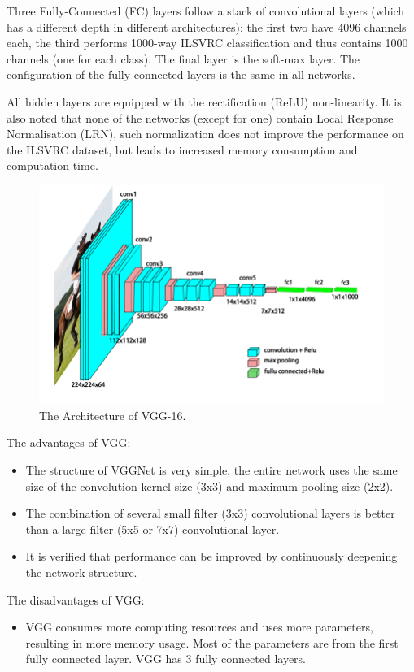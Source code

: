 Three Fully-Connected (FC) layers follow a stack of convolutional layers (which has a different depth in different architectures): the first two have 4096 channels each, the third performs 1000-way ILSVRC classification and thus contains 1000 channels (one for each class). The final layer is the soft-max layer. The configuration of the fully connected layers is the same in all networks.

All hidden layers are equipped with the rectification (ReLU) non-linearity. It is also noted that none of the networks (except for one) contain Local Response Normalisation (LRN), such normalization does not improve the performance on the ILSVRC dataset, but leads to increased memory consumption and computation time.


\begin{figure}[!htbp]
	\centering
	\includegraphics[width=0.8\linewidth]{figures/vgg16}
	\caption[The Architecture of VGG-16]{The Architecture of VGG-16.}
	\label{fig:vgg16}
\end{figure}

The advantages of VGG:
\begin{itemize}
	\item The structure of VGGNet is very simple, the entire network uses the same size of the convolution kernel size (3x3) and maximum pooling size (2x2).
	\item The combination of several small filter (3x3) convolutional layers is better than a large filter (5x5 or 7x7) convolutional layer.
	\item It is verified that performance can be improved by continuously deepening the network structure.
\end{itemize}

The disadvantages of VGG:

\begin{itemize}
	\item VGG consumes more computing resources and uses more parameters, resulting in more memory usage. Most of the parameters are from the first fully connected layer. VGG has 3 fully connected layers.
\end{itemize}



